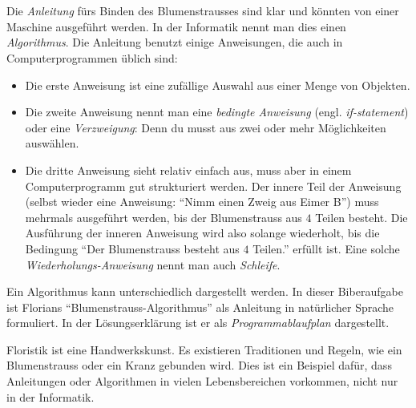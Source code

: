 {{%
\section*{\BrochureItsInformatics}
Die \emph{Anleitung} fürs Binden des Blumenstrausses sind klar und könnten von einer Maschine ausgeführt werden. In der Informatik nennt man dies einen \emph{Algorithmus}. Die Anleitung benutzt einige Anweisungen, die auch in Computerprogrammen üblich sind:

\begin{itemize}
  \item Die erste Anweisung ist eine zufällige Auswahl aus einer Menge von Objekten.
  \item Die zweite Anweisung nennt man eine \emph{bedingte Anweisung} (engl. \emph{if-statement}) oder eine \emph{Verzweigung}: Denn du musst aus zwei oder mehr Möglichkeiten auswählen.
  \item Die dritte Anweisung sieht relativ einfach aus, muss aber in einem Computerprogramm gut strukturiert werden. Der innere Teil der Anweisung (selbst wieder eine Anweisung: \enquote{Nimm einen Zweig aus Eimer B}) muss mehrmals ausgeführt werden, bis der Blumenstrauss aus $4$ Teilen besteht. Die Ausführung der inneren Anweisung wird also solange wiederholt, bis die Bedingung \enquote{Der Blumenstrauss besteht aus $4$ Teilen.} erfüllt ist. Eine solche \emph{Wiederholungs-Anweisung} nennt man auch \emph{Schleife}.
\end{itemize}

Ein Algorithmus kann unterschiedlich dargestellt werden.  In dieser Biberaufgabe ist Florians \enquote{Blumenstrauss-Algorithmus} als Anleitung in natürlicher Sprache formuliert. In der Lösungserklärung ist er als \emph{Programmablaufplan} dargestellt.

Floristik ist eine Handwerkskunst. Es existieren Traditionen und Regeln, wie ein Blumenstrauss oder ein Kranz gebunden wird. Dies ist ein Beispiel dafür, dass Anleitungen oder Algorithmen in vielen Lebensbereichen vorkommen, nicht nur in der Informatik.



}}
